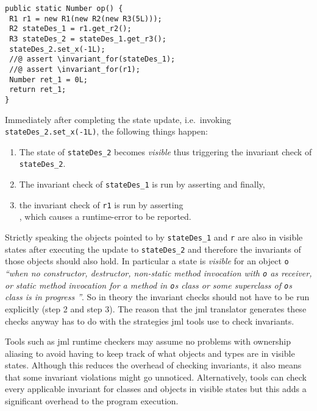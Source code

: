 \begin{lstlisting}[style=customJml,caption={Code-generated version of
the operation from
\autoref{lst:vdmRecNesting}.},label={lst:jmlRecNesting}]
public static Number op() {
 R1 r1 = new R1(new R2(new R3(5L)));
 R2 stateDes_1 = r1.get_r2();
 R3 stateDes_2 = stateDes_1.get_r3();
 stateDes_2.set_x(-1L);
 //@ assert \invariant_for(stateDes_1);
 //@ assert \invariant_for(r1);
 Number ret_1 = 0L;
 return ret_1;
}
\end{lstlisting}

Immediately after completing the state update, i.e.\ invoking
\texttt{stateDes\_2.set\_x(-1L)}, the following things happen:

\begin{enumerate}

\item The state of \texttt{stateDes\_2} becomes \emph{visible} thus
triggering the invariant check of \texttt{stateDes\_2}.

\item The invariant check of \texttt{stateDes\_1} is run by asserting
   and finally,

\item the invariant check of \texttt{r1} is run by asserting\\
  , which causes a runtime-error to be reported.
\end{enumerate}

Strictly speaking the objects pointed to by \texttt{stateDes\_1} and
\texttt{r} are also in visible states after executing the update to
\texttt{stateDes\_2} and therefore the invariants of those objects
should also hold. In particular a state is \emph{visible} for an
object \texttt{o} \textit{``when no constructor, destructor,
  non-static method invocation with \texttt{o} as receiver, or static
  method invocation for a method in \texttt{o}\textquotesingle s class
  or some superclass of \texttt{o}\textquotesingle s class is in
  progress \cite{Leavens&13}''}. So in theory the invariant checks
should not have to be run explicitly (step 2 and step 3). The reason
that the \ac{jml} translator generates these checks anyway has to do
with the strategies \ac{jml} tools use to check invariants.

Tools such as \ac{jml} runtime checkers may assume no problems with
ownership aliasing to avoid having to keep track of what objects and
types are in visible states. Although this reduces the overhead of
checking invariants, it also means that some invariant violations might
go unnoticed. Alternatively, tools can check every applicable
invariant for classes and objects in visible states but this adds a
significant overhead to the program execution.

